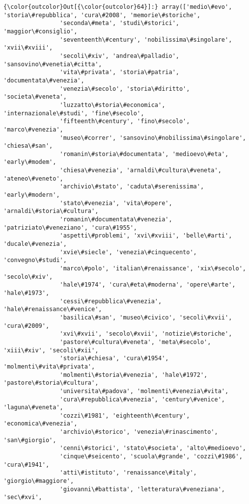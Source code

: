 \documentclass[11pt]{article}
\begin{document}
\begin{Verbatim}[commandchars=\\\{\}]
{\color{outcolor}Out[{\color{outcolor}64}]:} array(['medio\#evo', 'storia\#repubblica', 'cura\#2008', 'memorie\#storiche',
                'seconda\#meta', 'studi\#storici', 'maggior\#consiglio',
                'seventeenth\#century', 'nobilissima\#singolare', 'xvii\#xviii',
                'secoli\#xiv', 'andrea\#palladio', 'sansovino\#venetia\#citta',
                'vita\#privata', 'storia\#patria', 'documentata\#venezia',
                'venezia\#secolo', 'storia\#diritto', 'societa\#veneta',
                'luzzatto\#storia\#economica', 'internazionale\#studi', 'fine\#secolo',
                'fifteenth\#century', 'fino\#secolo', 'marco\#venezia',
                'museo\#correr', 'sansovino\#nobilissima\#singolare', 'chiesa\#san',
                'romanin\#storia\#documentata', 'medioevo\#eta', 'early\#modem',
                'chiesa\#venezia', 'arnaldi\#cultura\#veneta', 'ateneo\#veneto',
                'archivio\#stato', 'caduta\#serenissima', 'early\#modern',
                'stato\#venezia', 'vita\#opere', 'arnaldi\#storia\#cultura',
                'romanin\#documentata\#venezia', 'patriziato\#veneziano', 'cura\#1955',
                'aspetti\#problemi', 'xvi\#xviii', 'belle\#arti', 'ducale\#venezia',
                'xvie\#siecle', 'venezia\#cinquecento', 'convegno\#studi',
                'marco\#polo', 'italian\#renaissance', 'xix\#secolo', 'secolo\#xiv',
                'hale\#1974', 'cura\#eta\#moderna', 'opere\#arte', 'hale\#1973',
                'cessi\#repubblica\#venezia', 'hale\#renaissance\#venice',
                'basilica\#san', 'museo\#civico', 'secoli\#xvii', 'cura\#2009',
                'xvi\#xvii', 'secolo\#xvii', 'notizie\#storiche',
                'pastore\#cultura\#veneta', 'meta\#secolo', 'xiii\#xiv', 'secoli\#xii',
                'storia\#chiesa', 'cura\#1954', 'molmenti\#vita\#privata',
                'molmenti\#storia\#venezia', 'hale\#1972', 'pastore\#storia\#cultura',
                'universita\#padova', 'molmenti\#venezia\#vita',
                'cura\#repubblica\#venezia', 'century\#venice', 'laguna\#veneta',
                'cozzi\#1981', 'eighteenth\#century', 'economica\#venezia',
                'archivio\#storico', 'venezia\#rinascimento', 'san\#giorgio',
                'cenni\#storici', 'stato\#societa', 'alto\#medioevo',
                'cinque\#seicento', 'scuola\#grande', 'cozzi\#1986', 'cura\#1941',
                'atti\#istituto', 'renaissance\#italy', 'giorgio\#maggiore',
                'giovanni\#battista', 'letteratura\#veneziana', 'sec\#xvi',

\end{Verbatim}
\end{document}
